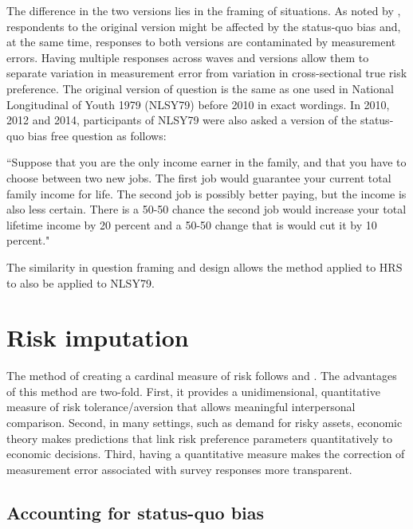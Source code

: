 \documentclass[]{article}
\begin{document}
The difference in the two versions lies in the framing of situations. As noted by \citet{kimball2008imputing}, respondents to the original version might be affected by the status-quo bias and, at the same time, responses to both versions are contaminated by measurement errors. Having multiple responses across waves and versions allow them to separate variation in measurement error from variation in cross-sectional true risk preference. The original version of question is the same as one used in National Longitudinal of Youth 1979 (NLSY79) before 2010 in exact wordings. In 2010, 2012 and 2014, participants of NLSY79 were also asked a version of the status-quo bias free question as follows:

\begin{center}
	\begin{minipage}{.9\linewidth}\small
		``Suppose that you are the only income earner in the family, and that you have to choose between two new jobs. The first job would guarantee your current total family income for life. The second job is possibly better paying, but the income is also less certain. There is a 50-50 chance the second job would increase your total lifetime income by 20 percent and a 50-50 change that is would cut it by 10 percent."
	\end{minipage}
\end{center} 

The similarity in question framing and design allows the method applied to HRS to also be applied to NLSY79.
	
\section{Risk imputation}
The method of creating a cardinal measure of risk follows \citet{barsky1997preference} and \citet{kimball2008imputing, kimball2009risk}. The advantages of this method are two-fold. First, it provides a unidimensional, quantitative measure of risk tolerance/aversion that allows meaningful interpersonal comparison. Second, in many settings, such as demand for risky assets, economic theory makes predictions that link risk preference parameters quantitatively to economic decisions. Third, having a quantitative measure makes the correction of measurement error associated with survey responses more transparent.

\subsection{Accounting for status-quo bias}
\end{document}

